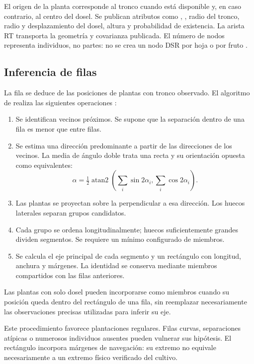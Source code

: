 El origen de la planta corresponde al tronco cuando está disponible y, en caso contrario, al centro del dosel. Se publican atributos como , , radio del tronco, radio y desplazamiento del dosel, altura y probabilidad de existencia. La arista RT transporta la geometría y covarianza publicada. El número de nodos representa individuos, no partes: no se crea un nodo DSR por hoja o por fruto \cite{conceptos,plants}.

\subsection{Inferencia de filas}
La fila se deduce de las posiciones de plantas con tronco observado. El algoritmo de  realiza las siguientes operaciones \cite{groups}:
\begin{enumerate}
\item Se identifican vecinos próximos. Se supone que la separación dentro de una fila es menor que entre filas.
\item Se estima una dirección predominante a partir de las direcciones de los vecinos. La media de ángulo doble trata una recta y su orientación opuesta como equivalentes:
\begin{equation}
\alpha=\tfrac12\operatorname{atan2}\left(\sum_i\sin 2\alpha_i,\sum_i\cos 2\alpha_i\right).
\end{equation}
\item Las plantas se proyectan sobre la perpendicular a esa dirección. Los huecos laterales separan grupos candidatos.
\item Cada grupo se ordena longitudinalmente; huecos suficientemente grandes dividen segmentos. Se requiere un mínimo configurado de miembros.
\item Se calcula el eje principal de cada segmento y un rectángulo con longitud, anchura y márgenes. La identidad se conserva mediante miembros compartidos con las filas anteriores.
\end{enumerate}
Las plantas con solo dosel pueden incorporarse como miembros cuando su posición queda dentro del rectángulo de una fila, sin reemplazar necesariamente las observaciones precisas utilizadas para inferir su eje.

Este procedimiento favorece plantaciones regulares. Filas curvas, separaciones atípicas o numerosos individuos ausentes pueden vulnerar sus hipótesis. El rectángulo incorpora márgenes de navegación: su extremo no equivale necesariamente a un extremo físico verificado del cultivo.

